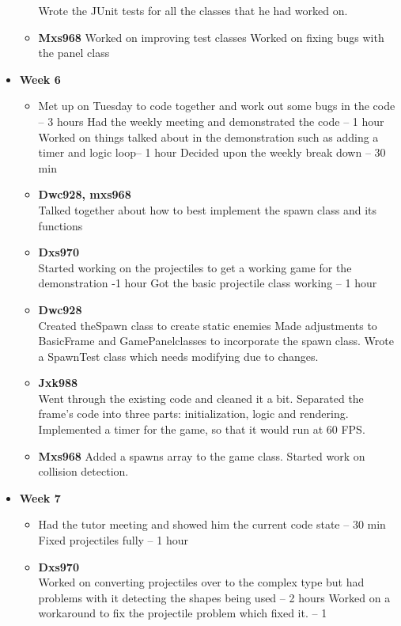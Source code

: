 \begin{itemize}
\begin{itemize}
    Wrote the JUnit tests for all the classes that he had worked on.
  \item \textbf{Mxs968} Worked on improving test classes Worked on
    fixing bugs with the panel class
  \end{itemize}
\item \textbf{Week 6}
  \begin{itemize}
  \item Met up on Tuesday to code together and work out some bugs in
    the code – 3 hours Had the weekly meeting and demonstrated the
    code – 1 hour Worked on things talked about in the demonstration
    such as adding a timer and logic loop– 1 hour Decided upon the
    weekly break down – 30 min
  \item \textbf{Dwc928, mxs968}\\ Talked together about how to best
    implement the spawn class and its functions
  \item \textbf{Dxs970}\\
    Started working on the projectiles to get a working game for the
    demonstration -1 hour Got the basic projectile class working – 1
    hour
  \item \textbf{Dwc928}\\
    Created theSpawn class to create static enemies Made adjustments
    to BasicFrame and GamePanelclasses to incorporate the spawn class.
    Wrote a SpawnTest class which needs modifying due to changes.
  \item \textbf{Jxk988}\\
    Went through the existing code and cleaned it a bit.  Separated
    the frame’s code into three parts: initialization, logic and
    rendering.  Implemented a timer for the game, so that it would run
    at 60 FPS.
  \item \textbf{Mxs968} Added a spawns array to the game class.
    Started work on collision detection.
  \end{itemize}
\item \textbf{Week 7}
  \begin{itemize}
  \item Had the tutor meeting and showed him the current code state –
    30 min Fixed projectiles fully – 1 hour
  \item \textbf{Dxs970}\\
    Worked on converting projectiles over to the complex type but had
    problems with it detecting the shapes being used – 2 hours Worked
    on a workaround to fix the projectile problem which fixed it. – 1

\end{itemize}
\end{itemize}
